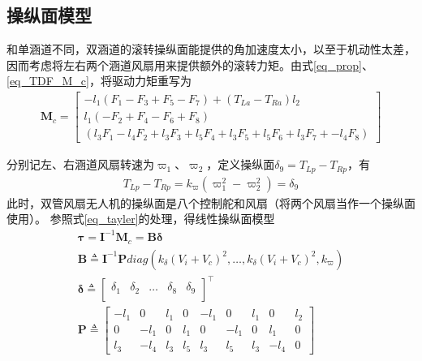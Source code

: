 \subsection{操纵面模型}
和单涵道不同，双涵道的滚转操纵面能提供的角加速度太小，以至于机动性太差，因而考虑将左右两个涵道风扇用来提供额外的滚转力矩。由式\eqref{eq_prop}、\eqref{eq_TDF_M_c}，将驱动力矩重写为
\begin{align}
\bm{M}_{c}=
\begin{bmatrix}
-{{l}_{1}}\left(F_1-F_3+F_5-F_7\right) +(T_{La}-T_{Ra})l_2 \\
{{l}_{1}}\left(-F_2+F_4-F_6+F_8\right) \\
\left(l_3 F_{1} - l_4 F_{2} + l_3 F_{3} + l_5 F_{4} + l_3 F_5 + l_5 F_6 + l_3 F_7 + -l_4 F_8 \right)
\end{bmatrix}	\label{eq_new_TDF_M_c}
\end{align}	

分别记左、右涵道风扇转速为$ \varpi_{{1}} $、$ \varpi_{{2}} $，定义操纵面$\delta_9=T_{Lp}- T_{Rp}$，有
\begin{align}
T_{Lp}- T_{Rp} = k_{\varpi}\left( \varpi _{{1}}^{2}-\varpi _{{2}}^{2} \right)=    \delta_9
\end{align}
此时，双管风扇无人机的操纵面是八个控制舵和风扇（将两个风扇当作一个操纵面使用）。 参照式\eqref{eq_tayler}的处理，得线性操纵面模型
\begin{gather}
\bm{\tau}=\bm{I}^{-1}\bm{M}_{ {c}}=\bm{B}\bm{\delta}	\\
\bm{B}\triangleq \bm{I}^{-1}\bm{P}diag\left( k_{\delta} (V_i+V_c)^2,\ldots ,k_{\delta} (V_i+V_c)^2, k_{\varpi} \right) \\
\bm{\delta}\triangleq {\left[ 
	\begin{matrix}
	\delta_1 & \delta_2 & \ldots  & \delta_8 & \delta_9  \\
	\end{matrix} \right]}^\top	\\
\bm{P} \triangleq \begin{bmatrix}
-l_{1} & 0 & l_{1} & 0 & -l_{1} & 0 & l_{1} & 0 & l_2\\
0 & -l_{1} & 0 & l_{1} & 0 & -l_{1} & 0 & l_{1}  &0\\
l_{3} & -l_{4} & l_{3} & l_{5} & l_{3} & l_{5} & l_{3} & -l_{4}&0 
\end{bmatrix}
\end{gather}

